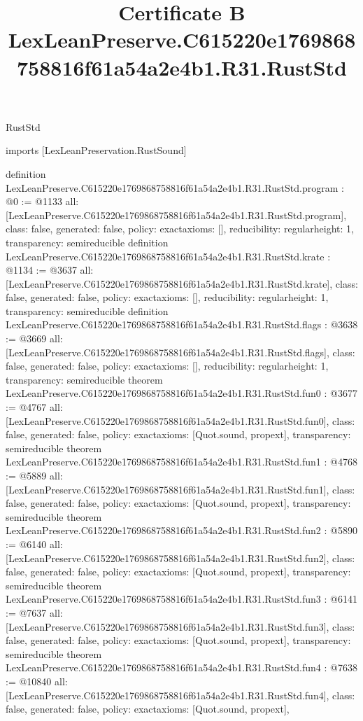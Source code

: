 \begin{lexlean}{RustStd}
\title{Certificate B LexLeanPreserve.C615220e1769868758816f61a54a2e4b1.R31.RustStd}
\begin{coremodule}
imports [LexLeanPreservation.RustSound]

definition LexLeanPreserve.C615220e1769868758816f61a54a2e4b1.R31.RustStd.program : @0 := @1133 {
  all: [LexLeanPreserve.C615220e1769868758816f61a54a2e4b1.R31.RustStd.program],
  class: false,
  generated: false,
  policy: exact{axioms: []},
  reducibility: regular{height: 1},
  transparency: semireducible
}
definition LexLeanPreserve.C615220e1769868758816f61a54a2e4b1.R31.RustStd.krate : @1134 := @3637 {
  all: [LexLeanPreserve.C615220e1769868758816f61a54a2e4b1.R31.RustStd.krate],
  class: false,
  generated: false,
  policy: exact{axioms: []},
  reducibility: regular{height: 1},
  transparency: semireducible
}
definition LexLeanPreserve.C615220e1769868758816f61a54a2e4b1.R31.RustStd.flags : @3638 := @3669 {
  all: [LexLeanPreserve.C615220e1769868758816f61a54a2e4b1.R31.RustStd.flags],
  class: false,
  generated: false,
  policy: exact{axioms: []},
  reducibility: regular{height: 1},
  transparency: semireducible
}
theorem LexLeanPreserve.C615220e1769868758816f61a54a2e4b1.R31.RustStd.fun0 : @3677 := @4767 {
  all: [LexLeanPreserve.C615220e1769868758816f61a54a2e4b1.R31.RustStd.fun0],
  class: false,
  generated: false,
  policy: exact{axioms: [Quot.sound, propext]},
  transparency: semireducible
}
theorem LexLeanPreserve.C615220e1769868758816f61a54a2e4b1.R31.RustStd.fun1 : @4768 := @5889 {
  all: [LexLeanPreserve.C615220e1769868758816f61a54a2e4b1.R31.RustStd.fun1],
  class: false,
  generated: false,
  policy: exact{axioms: [Quot.sound, propext]},
  transparency: semireducible
}
theorem LexLeanPreserve.C615220e1769868758816f61a54a2e4b1.R31.RustStd.fun2 : @5890 := @6140 {
  all: [LexLeanPreserve.C615220e1769868758816f61a54a2e4b1.R31.RustStd.fun2],
  class: false,
  generated: false,
  policy: exact{axioms: [Quot.sound, propext]},
  transparency: semireducible
}
theorem LexLeanPreserve.C615220e1769868758816f61a54a2e4b1.R31.RustStd.fun3 : @6141 := @7637 {
  all: [LexLeanPreserve.C615220e1769868758816f61a54a2e4b1.R31.RustStd.fun3],
  class: false,
  generated: false,
  policy: exact{axioms: [Quot.sound, propext]},
  transparency: semireducible
}
theorem LexLeanPreserve.C615220e1769868758816f61a54a2e4b1.R31.RustStd.fun4 : @7638 := @10840 {
  all: [LexLeanPreserve.C615220e1769868758816f61a54a2e4b1.R31.RustStd.fun4],
  class: false,
  generated: false,
  policy: exact{axioms: [Quot.sound, propext]},
}
\end{coremodule}
\end{lexlean}
